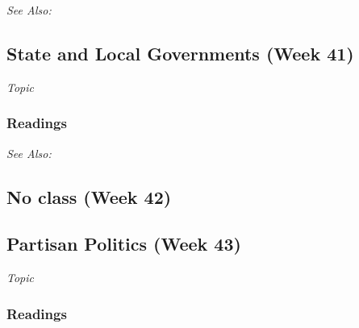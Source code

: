 \documentclass[12pt,a4paper]{article}
\newcommand{\seealso}{\noindent \emph{See Also:}\\}
\begin{document}

\seealso



\clearpage
\subsection{State and Local Governments (Week 41)}
\emph{Topic}
\vspace{1em}
\subsubsection*{Readings}





\seealso


\clearpage
\subsection{No class (Week 42)}

\clearpage
\subsection{Partisan Politics (Week 43)}
\emph{Topic}
\vspace{1em}

\subsubsection*{Readings}
\end{document}
